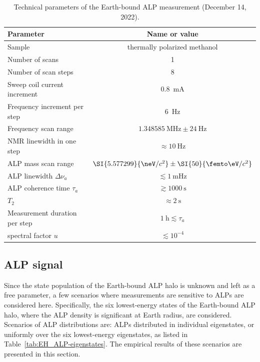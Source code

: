 \begin{table}[htb]
    \centering
    \caption{Technical parameters of the Earth-bound ALP measurement (December 14, 2022).}
    \label{tab:earthmeas_params}
    \begin{tabular}{lc}
        \toprule
        Parameter & Name or value \\
        \hline
        Sample & thermally polarized methanol \\
        Number of scans & 1 \\
        Number of scan steps & 8 \\
        Sweep coil current increment & \SI{0.8}{\mA} \\
        Frequency increment per step & \SI{6}{\Hz} \\
        Frequency scan range & $\SI{1.348585}{\MHz} \pm \SI{24}{\Hz}$ \\
        NMR linewidth in one step & $\approx\SI{10}{\Hz}$ \\
        ALP mass scan range & $\SI{5.577299}{\neV/c^2}\pm\SI{50}{\femto\eV/c^2}$ \\
        ALP linewidth $\Delta\nu_a$ & $\lesssim \SI{1}{\mHz}$ \\
        ALP coherence time $\tau_a$ & $\gtrsim \SI{1000}{\s}$ \\
        $T_2$ & $\approx\SI{2}{\s}$ \\
        Measurement duration per step & $\SI{1}{\hour}\lesssim \tau_a $ \\
        spectral factor $u$ & $\lesssim 10^{-4}$ \\
        \bottomrule
    \end{tabular}
\end{table}


\subsection{ALP signal}



Since the state population of the Earth-bound ALP halo is unknown and left as a free parameter, a few scenarios where measurements are sensitive to ALPs are considered here. 
Specifically, the six lowest-energy states of the Earth-bound ALP halo, where the ALP density is significant at Earth radius, are considered. 
Scenarios of ALP distributions are: ALPs distributed in individual eigenstates, or uniformly over the six lowest-energy eigenstates, as listed in Table~\ref{tab:EH_ALP-eigenstates}.
The empirical results of these scenarios are presented in this section.

